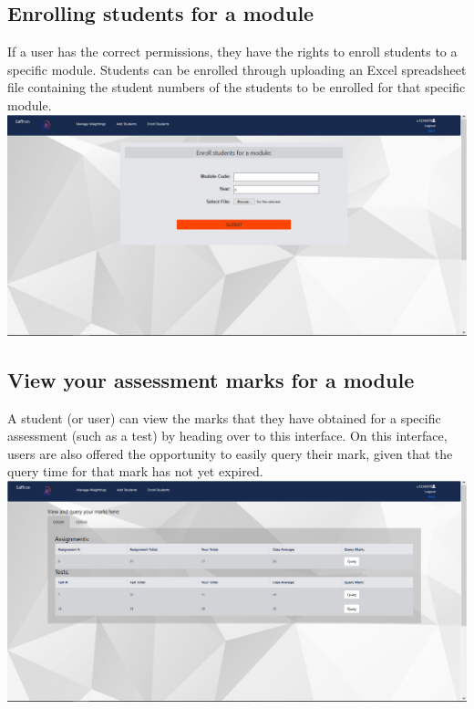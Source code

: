 \documentclass[a4paper,12pt]{article}
\begin{document}
        
        \subsection{Enrolling students for a module}
        
        If a user has the correct permissions, they have the rights to enroll students to a specific module. Students can be enrolled through uploading an Excel spreadsheet file containing the student numbers of the students to be enrolled for that specific module.\\[1.0cm]
        
        \includegraphics[width=1\textwidth]{../images/screens/enroll-students.PNG}\\[1.0cm]
     	\pagebreak
    	\subsection{View your assessment marks for a module}
        
        A student (or user) can view the marks that they have obtained for a specific assessment (such as a test) by heading over to this interface. On this interface, users are also offered the opportunity to easily query their mark, given that the query time for that mark has not yet expired.\\[1.0cm]
        
        \includegraphics[width=1\textwidth]{../images/screens/student-view-marks.PNG}\\[1.0cm]
        
\end{document}
